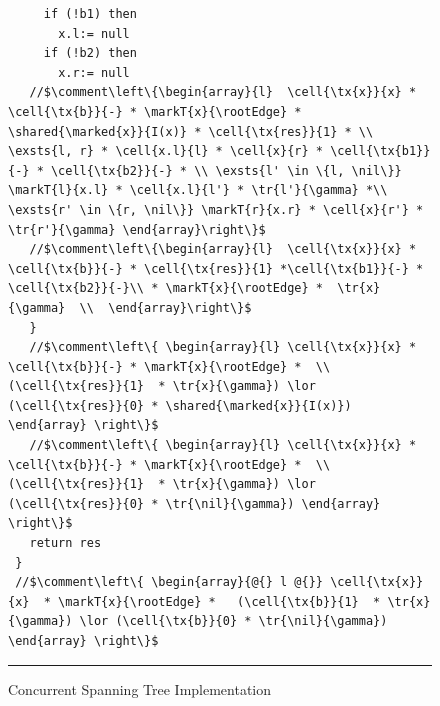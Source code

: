 \begin{figure}
\begin{lstlisting}
     if (!b1) then 
       x.l:= null
     if (!b2) then 
       x.r:= null
   //$\comment\left\{\begin{array}{l}  \cell{\tx{x}}{x} * \cell{\tx{b}}{-} * \markT{x}{\rootEdge} * \shared{\marked{x}}{I(x)} * \cell{\tx{res}}{1} * \\ \exsts{l, r} * \cell{x.l}{l} * \cell{x}{r} * \cell{\tx{b1}}{-} * \cell{\tx{b2}}{-} * \\ \exsts{l' \in \{l, \nil\}} \markT{l}{x.l} * \cell{x.l}{l'} * \tr{l'}{\gamma} *\\ \exsts{r' \in \{r, \nil\}} \markT{r}{x.r} * \cell{x}{r'} * \tr{r'}{\gamma} \end{array}\right\}$  
   //$\comment\left\{\begin{array}{l}  \cell{\tx{x}}{x} * \cell{\tx{b}}{-} * \cell{\tx{res}}{1} *\cell{\tx{b1}}{-} * \cell{\tx{b2}}{-}\\ * \markT{x}{\rootEdge} *  \tr{x}{\gamma}  \\  \end{array}\right\}$         
   }		
   //$\comment\left\{ \begin{array}{l} \cell{\tx{x}}{x} * \cell{\tx{b}}{-} * \markT{x}{\rootEdge} *  \\  (\cell{\tx{res}}{1}  * \tr{x}{\gamma}) \lor (\cell{\tx{res}}{0} * \shared{\marked{x}}{I(x)}) \end{array} \right\}$ 
   //$\comment\left\{ \begin{array}{l} \cell{\tx{x}}{x} * \cell{\tx{b}}{-} * \markT{x}{\rootEdge} *  \\  (\cell{\tx{res}}{1}  * \tr{x}{\gamma}) \lor (\cell{\tx{res}}{0} * \tr{\nil}{\gamma}) \end{array} \right\}$      
   return res
 }
 //$\comment\left\{ \begin{array}{@{} l @{}} \cell{\tx{x}}{x}  * \markT{x}{\rootEdge} *   (\cell{\tx{b}}{1}  * \tr{x}{\gamma}) \lor (\cell{\tx{b}}{0} * \tr{\nil}{\gamma}) \end{array} \right\}$         
\end{lstlisting}
\hrule\vspace*{5pt}
\caption{Concurrent Spanning Tree Implementation}
\label{fig:conSpanningTree}
\end{figure}
%


%
